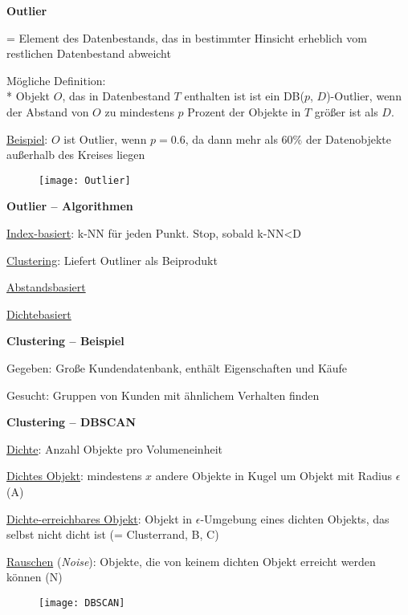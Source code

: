 \textbf{Outlier}
\begin{items}
	\item = Element des Datenbestands, das in bestimmter Hinsicht erheblich vom restlichen Datenbestand abweicht
	\item Mögliche Definition: \\*
		Objekt \( O \), das in Datenbestand \( T \) enthalten ist ist ein DB(\( p \), \( D \))-Outlier, wenn der Abstand von \( O \) zu mindestens \( p \) Prozent der Objekte in \( T \) größer ist als \( D \).
	\item \underline{Beispiel}: \( O \) ist Outlier, wenn \( p=0.6 \), da dann mehr als \( 60\% \) der Datenobjekte außerhalb des Kreises liegen
\end{items}
\begin{figure}[H]\centering\label{Outlier}\texttt{[image: Outlier]}\end{figure}

\textbf{Outlier -- Algorithmen}
\begin{items}
	\item \underline{Index-basiert}: k-NN für jeden Punkt. Stop, sobald k-NN<D
	\item \underline{Clustering}: Liefert Outliner als Beiprodukt
	\item \underline{Abstandsbasiert}
	\item \underline{Dichtebasiert}
\end{items}

\newpage

\textbf{Clustering -- Beispiel}
\begin{items}
	\item Gegeben: Große Kundendatenbank, enthält Eigenschaften und Käufe
	\item Gesucht: Gruppen von Kunden mit ähnlichem Verhalten finden
\end{items}

\textbf{Clustering -- DBSCAN}
\begin{items}
	\item \underline{Dichte}: Anzahl Objekte pro Volumeneinheit
	\item \underline{Dichtes Objekt}: mindestens \( x \) andere Objekte in Kugel um Objekt mit Radius \( \epsilon \) (A)
	\item \underline{Dichte-erreichbares Objekt}: Objekt in \( \epsilon \)-Umgebung eines dichten Objekts, das selbst nicht dicht ist (= Clusterrand, B, C)
	\item \underline{Rauschen} (\emph{Noise}): Objekte, die von keinem dichten Objekt erreicht werden können (N)
\end{items}
\begin{figure}[H]\centering\label{DBSCAN}\texttt{[image: DBSCAN]}\end{figure}

